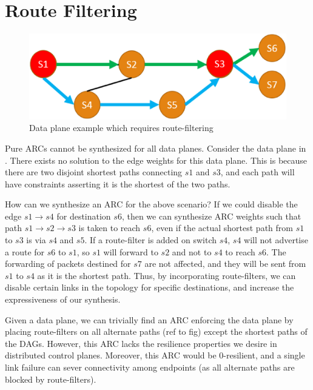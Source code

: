 \section{Route Filtering}
\begin{figure}[h!] 
	\centering
	\includegraphics[width=\columnwidth]{figures/diamond.eps}
	\caption{Data plane example which requires route-filtering} \label{fig:diamond}
\end{figure}
Pure ARCs cannot be synthesized for all data planes. Consider the data
plane in . 
There exists no solution to the edge weights for this data plane. This is because 
there are two disjoint shortest paths connecting $s1$ and $s3$, and each path will have 
constraints
asserting it is the shortest of the two paths. 

How can we synthesize an ARC for the above scenario? 
If we could disable the edge
$s1 \rightarrow s4$ for destination $s6$, then we can synthesize ARC weights
such that path $s1 \rightarrow s2 \rightarrow s3$ is taken to reach $s6$, 
even if the actual shortest path
from $s1$ to $s3$ is via $s4$ and $s5$. 
If a route-filter is added on switch $s4$, $s4$ 
will not advertise a route for $s6$ to $s1$, so 
$s1$ will forward to $s2$ and not to $s4$
to reach $s6$. The forwarding of packets destined
for $s7$ are not affected, and they will be sent from
$s1$ to $s4$ as it is the shortest path.
Thus, by incorporating route-filters, we can
disable certain links in the topology 
for specific destinations, and increase the 
expressiveness of our synthesis. 

Given a data plane, we can trivially find an 
ARC enforcing the data plane by placing 
route-filters on all alternate paths (ref to fig)
except the shortest paths of the DAGs. However, this
ARC lacks the resilience properties we desire in
distributed control planes. Moreover, this ARC would be
0-resilient, and a single link failure can sever 
connectivity among endpoints (as all alternate paths
are blocked by route-filters). 

